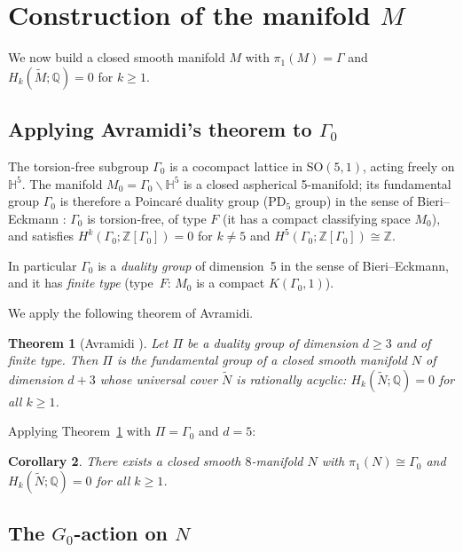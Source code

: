 \documentclass[12pt]{article}
\newtheorem{theorem}{Theorem}
\newtheorem{corollary}[theorem]{Corollary}
\theoremstyle{definition}
\theoremstyle{remark}
\begin{document}
\section{Construction of the manifold $M$}
\label{sec:manifold}

We now build a closed smooth manifold $M$ with $\pi_1(M) = \Gamma$ and
$H_k(\widetilde{M};\mathbb{Q}) = 0$ for $k \geq 1$.

\subsection{Applying Avramidi's theorem to $\Gamma_0$}
\label{sub:avramidi}

The torsion-free subgroup $\Gamma_0$ is a cocompact lattice in $\mathrm{SO}(5,1)$,
acting freely on $\mathbb{H}^5$. The manifold $M_0 = \Gamma_0 \backslash \mathbb{H}^5$ is
a closed aspherical 5-manifold; its fundamental group $\Gamma_0$ is therefore a
Poincar\'e duality group (PD$_5$ group) in the sense of Bieri--Eckmann \cite{BE1973}:
$\Gamma_0$ is torsion-free, of type $F$ (it has a compact classifying space $M_0$),
and satisfies $H^k(\Gamma_0;\mathbb{Z}[\Gamma_0]) = 0$ for $k\neq 5$ and
$H^5(\Gamma_0;\mathbb{Z}[\Gamma_0]) \cong \mathbb{Z}$.

In particular $\Gamma_0$ is a \emph{duality group} of dimension~5 in the sense of
Bieri--Eckmann, and it has \emph{finite type} (type~$F$: $M_0$ is a compact $K(\Gamma_0,1)$).

We apply the following theorem of Avramidi.

\begin{theorem}[Avramidi {\cite[Thm.~1.1]{Avramidi2018}}]
\label{thm:avramidi}
Let $\Pi$ be a duality group of dimension $d \geq 3$ and of finite type. Then $\Pi$ is
the fundamental group of a closed smooth manifold $N$ of dimension $d+3$ whose universal
cover $\widetilde{N}$ is rationally acyclic: $H_k(\widetilde{N};\mathbb{Q}) = 0$ for
all $k \geq 1$.
\end{theorem}

Applying Theorem~\ref{thm:avramidi} with $\Pi = \Gamma_0$ and $d = 5$:

\begin{corollary}
\label{cor:N}
There exists a closed smooth $8$-manifold $N$ with $\pi_1(N) \cong \Gamma_0$ and
$H_k(\widetilde{N};\mathbb{Q}) = 0$ for all $k \geq 1$.
\end{corollary}

\subsection{The $G_0$-action on $N$}
\label{sub:action}
\end{document}
